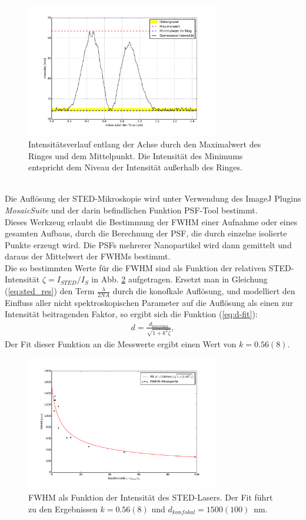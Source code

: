 \begin{figure}
	\centering
	\includegraphics[width=0.75\textwidth]{plots/doughnut.pdf}
	\caption{Intensitätsverlauf entlang der Achse durch den Maximalwert des Ringes und dem Mittelpunkt.
	Die Intensität des Minimums entspricht dem Niveau der Intensität außerhalb des Ringes.}
	\label{fig:doughnut}
\end{figure}
\\ 
Die Auflösung der STED-Mikroskopie wird unter Verwendung des ImageJ Plugins \emph{MosaicSuite} und der darin befindlichen Funktion PSF-Tool bestimmt.\\
Dieses Werkzeug erlaubt die Bestimmung der FWHM einer Aufnahme oder eines gesamten Aufbaus, durch die Berechnung der PSF, die durch einzelne isolierte Punkte erzeugt wird.
Die PSFs mehrerer Nanopartikel wird dann gemittelt und daraus der Mittelwert der FWHMs bestimmt.
\\
Die so bestimmten Werte für die FWHM sind als Funktion der relativen STED-Intensität $\zeta = I_{STED}/I_S$ in Abb. \ref{fig:sted_res} aufgetragen.
Ersetzt man in Gleichung (\ref{eq:sted_res}) den Term $\frac{\lambda}{2NA}$ durch die konofkale Auflösung, und modelliert den Einfluss aller nicht spektroskopischen Parameter auf die Auflösung als einen zur Intensität beitragenden Faktor, so ergibt sich die Funktion (\ref{eq:d-fit}):
\begin{align}
	d = \frac{d_{konfokal}}{\sqrt{1+k^2\zeta}}, \label{eq:d-fit}
\end{align}
Der Fit dieser Funktion an die Messwerte ergibt einen Wert von $k=0.56(8)$.
\begin{figure}
	\centering
	\includegraphics[width=0.75\textwidth]{plots/fwhm_zeta.pdf}
	\caption{FWHM als Funktion der Intensität des STED-Lasers. Der Fit führt zu den Ergebnissen $k = 0.56(8)$ und $d_{konfokal} = 1500(100)$~nm. 
	}\label{fig:sted_res}
\end{figure}

